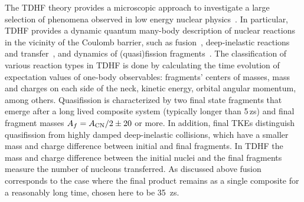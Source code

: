 The TDHF theory provides a microscopic approach to investigate
a large selection of phenomena
observed in low energy nuclear physics~\citep{negele1982,simenel2012,simenel2018}.
In particular, TDHF provides a dynamic quantum many-body description of
nuclear reactions in the
vicinity of the Coulomb barrier, such as fusion~\citep{bonche1978,flocard1978,simenel2001,umar2008a,umar2006d,
	washiyama2008,umar2010a,guo2012,keser2012,simenel2013a,oberacker2012,oberacker2010,umar2012a,simenel2013b,umar2014a,jiang2014},
deep-inelastic reactions and transfer~\citep{koonin1977,simenel2010,simenel2011,umar2008a,
	sekizawa2013,scamps2013a,sekizawa2014,bourgin2016,umar2017,sekizawa2019},
and dynamics of (quasi)fission fragments~\citep{umar2010a,wakhle2014,oberacker2014,simenel2014a,
	umar2015a,umar2015c,scamps2015a,goddard2015,bulgac2016,sekizawa2016,umar2016}.
The classification of various reaction types in TDHF is done by calculating the
time evolution of expectation values of one-body observables:
fragments' centers of masses, mass and charges on each side of the neck, kinetic energy,
orbital angular momentum, among others. Quasifission is characterized by two final
state fragments that emerge after a long lived composite system (typically longer
than 5\,zs) and final fragment masses $A_{f} = A_{\rm CN}/2 \pm 20$ or more. In
addition, final TKEs distinguish quasifission from highly damped deep-inelastic
collisions, which have a smaller mass and charge difference between initial and
final fragments. In TDHF the mass and charge difference between the initial nuclei
and the final fragments measure the number of nucleons transferred. As discussed
above fusion corresponds to the case where the final product remains as a single composite
for a reasonably long time, chosen here to be 35~zs.

